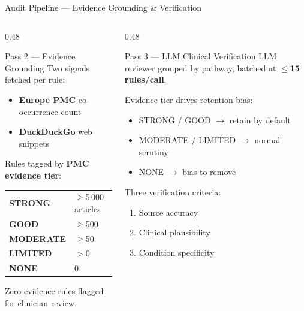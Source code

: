 \documentclass[aspectratio=169]{beamer}
\begin{document}
\begin{frame}{Audit Pipeline --- Evidence Grounding \& Verification}
  \begin{columns}[T]
    \begin{column}{0.48\textwidth}
      \begin{block}{Pass 2 --- Evidence Grounding}
        \small
        Two signals fetched per rule:
        \begin{itemize}
          \item \textbf{Europe PMC} co-occurrence count
          \item \textbf{DuckDuckGo} web snippets
        \end{itemize}
        \vspace{0.2em}
        Rules tagged by \textbf{PMC evidence tier}:
        \begin{center}
          \footnotesize
          \begin{tabular}{@{}ll@{}}
            \textbf{STRONG}   & $\geq$5\,000 articles \\
            \textbf{GOOD}     & $\geq$500 \\
            \textbf{MODERATE} & $\geq$50 \\
            \textbf{LIMITED}  & $>$0 \\
            \textbf{NONE}     & 0 \\
          \end{tabular}
        \end{center}
        Zero-evidence rules flagged for clinician review.
      \end{block}
    \end{column}
    \begin{column}{0.48\textwidth}
      \begin{block}{Pass 3 --- LLM Clinical Verification}
        \small
        LLM reviewer grouped by pathway, batched at \textbf{$\leq$15 rules/call}.

        \vspace{0.2em}
        Evidence tier drives retention bias:
        \begin{itemize}
          \item STRONG / GOOD $\to$ retain by default
          \item MODERATE / LIMITED $\to$ normal scrutiny
          \item NONE $\to$ bias to remove
        \end{itemize}

        \vspace{0.2em}
        Three verification criteria:
        \begin{enumerate}
          \item Source accuracy
          \item Clinical plausibility
          \item Condition specificity
        \end{enumerate}
      \end{block}
    \end{column}
  \end{columns}
\end{frame}
\end{document}
